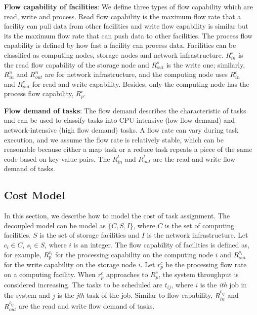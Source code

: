 \textbf{Flow capability of facilities}:
We define three types of flow capability which are read, write and process.
Read flow capability is the maximum flow rate that a facility can pull data from other facilities and write flow capability is similar but its the maximum flow rate that can push data to other facilities.
The process flow capability is defined by how fast a facility can process data.
Facilities can be classified as computing nodes, storage nodes and network infrastructure.
$R^{s}_{in}$ is the read flow capability of the storage node and $R^{s}_{out}$ is the write one; similarly, $R^{n}_{in}$ and $R^{n}_{out}$ are for network infrastructure, and the computing node uses $R^{c}_{in}$ and $R^{c}_{out}$ for read and write capability.
Besides, only the computing node has the process flow capability, $R^{c}_{p}$.

\textbf{Flow demand of tasks}:
The flow demand describes the characteristic of tasks and can be used to classify tasks into CPU-intensive (low flow demand) and network-intensive (high flow demand) tasks.
A flow rate can vary during task execution, and we assume the flow rate is relatively stable, which can be reasonable because either a map task or a reduce task repeats a piece of the same code based on key-value pairs.
The $R^{t}_{in}$ and $R^{t}_{out}$ are the read and write flow demand of tasks.

\subsection{Cost Model}
\label{sec:cost_model}

In this section, we describe how to model the cost of task assignment.
The decoupled model can be model as $\{C, S, I\}$, where $C$ is the set of computing facilities, $S$ is the set of storage facilities and $I$ is the network infrastructure. 
Let $c_{i} \in C$, $s_{i} \in S$, where $i$ is an integer.
The flow capability of facilities is defined as, for example, $R^{c_{i}}_{p}$ for the processing capability on the computing node $i$ and $R^{s_{i}}_{out}$ for the write capability on the storage node $i$.
Let $r^{c}_{p}$ be the processing flow rate on a computing facility.
When $r^{c}_{p}$ approaches to $R^{c}_{p}$, the system throughput is considered increasing.
The tasks to be scheduled are $t_{ij}$, where $i$ is the \textit{ith} job in the system and $j$ is the \textit{jth} task of the job.
Similar to flow capability, $R^{t_{ij}}_{in}$ and $R^{t_{ij}}_{out}$ are the read and write flow demand of tasks.


